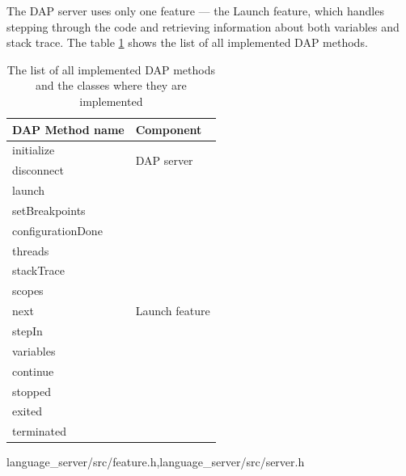 The DAP server uses only one feature --- the Launch feature, which handles stepping through the code and retrieving information about both variables and stack trace. The table \cref{DAP_methods} shows the list of all implemented DAP methods.

\begin{table}
	\centering
	\begin{tabular}{ll}
		\toprule
		\textbf{DAP Method name} & \textbf{Component}                 \\ \midrule
		initialize               & \multirow{2}{3cm}{DAP server
		\srcstyle{language\_server/src/dap/dap\_server.h}}      \\
		disconnect               &                                    \\ \midrule
		launch                   & \multirow{13}{3cm}{Launch feature
		\srcstyle{language\_server/src/dap/feature\_launch.h}} \\
		setBreakpoints           &                                    \\
		configurationDone        &                                    \\
		threads                  &                                    \\
		stackTrace               &                                    \\
		scopes                   &                                    \\
		next                     &                                    \\
		stepIn                   &                                    \\
		variables                &                                    \\
		continue                 &                                    \\
		stopped                  &                                    \\
		exited                   &                                    \\
		terminated               &                                    \\ \bottomrule
	\end{tabular}
	\caption{The list of all implemented DAP methods and the classes where they are implemented}
	\label{DAP_methods}
\end{table}

{language\_server/src/feature.h,language\_server/src/server.h}

